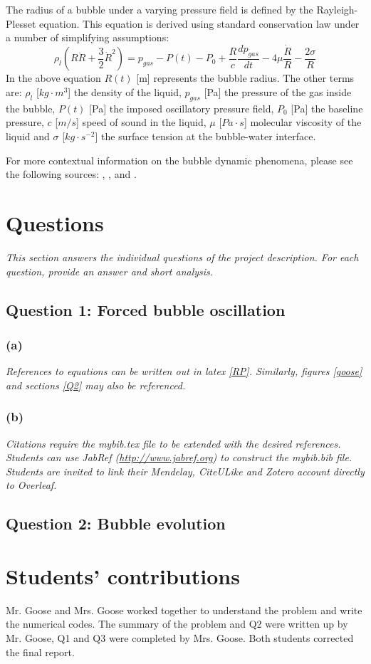 \documentclass[12pt]{article}
\begin{document}
The radius of a bubble under a varying pressure field is defined by the Rayleigh-Plesset equation. This equation is derived using standard conservation law under a number of simplifying assumptions:
\begin{equation}
\rho_l \left(R\ddot{R} + \frac{3}{2}\dot{R}^2\right) = p_{gas} -P(t) -P_0 +\frac{R}{c}\frac{d p_{gas}}{dt} - 4\mu \frac{\dot{R}}{R}-\frac{2\sigma}{R}
\label{RP}
\end{equation}
In the above equation $R(t)$ [m] represents the bubble radius. The other terms are: $\rho_l$ [$kg\cdot m^3$]  the density of the liquid, $p_{gas}$ [Pa] the pressure of the gas inside the bubble, $P(t)$ [Pa] the imposed oscillatory pressure field, $P_0$ [Pa] the baseline pressure, $c$ [$m/s$] speed of sound in the liquid, $\mu$ [$Pa\cdot s$] molecular viscosity of the liquid and $\sigma$ [$kg\cdot s^{-2}$] the surface tension at the bubble-water interface.

For more contextual information on the bubble dynamic phenomena, please see the following sources: \cite{Hilgenfeldt1998}, \cite{Kreider2011}, and \cite{Lohse2003}.



\section{Questions}
\emph{This section answers the individual questions of the project description.  For each question, provide an answer and short analysis.}
\subsection*{Question 1: Forced bubble oscillation}
\subsubsection*{(a)} \emph{References to equations can be written out in latex \eqref{RP}. Similarly, figures  \ref{goose} and sections \ref{Q2} may also be referenced.}
\subsubsection*{(b)} \emph{Citations require the mybib.tex file to be extended with the desired references. Students can use JabRef (\url{http://www.jabref.org}) to construct the mybib.bib file. Students are invited to link their Mendelay, CiteULike and Zotero account directly to Overleaf. }

\subsection{Question 2: Bubble evolution \label{Q2}}


\vfill

\section*{Students' contributions}
Mr. Goose and Mrs. Goose worked together to understand the problem and write the numerical codes. The summary of the problem and Q2 were written up by Mr. Goose, Q1 and Q3 were completed by Mrs. Goose. Both students corrected the final report.

\newpage

\end{document}
